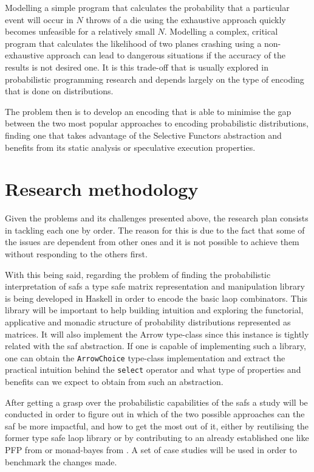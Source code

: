 \documentclass[
  oneside,
  11pt, a4paper,
  footinclude=true,
  headinclude=true,
  cleardoublepage=empty
]{scrbook}
\theoremstyle{definition}
\theoremstyle{definition}
\begin{document}
    Modelling a simple program that calculates the probability that a particular event will occur in $N$ throws of a die using the exhaustive approach quickly becomes unfeasible for a relatively small $N$. Modelling a complex, critical program that calculates the likelihood of two planes crashing using a non-exhaustive approach can lead to dangerous situations if the accuracy of the results is not desired one. It is this trade-off that is usually explored in probabilistic programming research and depends largely on the type of encoding that is done on distributions.

    The problem then is to develop an  encoding that is able to minimise the gap between the two most popular approaches to encoding probabilistic distributions, finding one that takes advantage of the Selective Functors abstraction and benefits from its static analysis or speculative execution properties.
	
	\section{Research methodology}\label{sec-approach}
	
	Given the problems and its challenges presented above, the research plan consists in tackling each one by order. The reason for this is due to the fact that some of the issues are dependent from other ones and it is not possible to achieve them without responding to the others first.
	
	With this being said, regarding the problem of finding the probabilistic interpretation of \gls{saf}s a type safe matrix representation and manipulation library is being developed in Haskell in order to encode the basic \gls{laop} combinators. This library will be important to help building intuition and exploring the functorial, applicative and monadic structure of probability distributions represented as matrices. It will also implement the Arrow type-class since this instance is tightly related with the \gls{saf} abstraction. If one is capable of implementing such a library, one can obtain the \texttt{ArrowChoice} type-class implementation and extract the practical intuition behind the \texttt{select} operator and what type of properties and benefits can we expect to obtain from such an abstraction.
	
	After getting a grasp over the probabilistic capabilities of the \gls{saf}s a study will be conducted in order to figure out in which of the two possible approaches can the \gls{saf} be more impactful, and how to get the most out of it, either by reutilising the former type safe \gls{laop} library or by contributing to an already established one like PFP from \cite{erwig_kollmansberger_2006} or monad-bayes from \cite{scibior2018functional}. A set of case studies will be used in order to benchmark the changes made.
	
\end{document}
